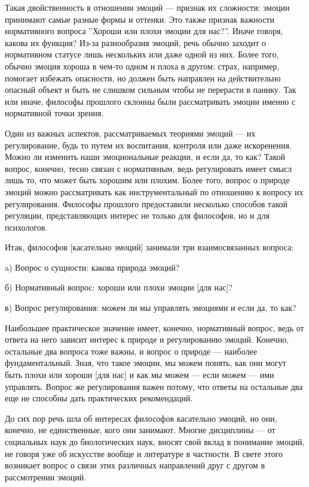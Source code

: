 \documentclass[11pt]{book}
\begin{document}
Такая двойственность в отношении эмоций --- признак их сложности: эмоции принимают самые разные формы и оттенки. Это также признак важности нормативного вопроса ''Хороши или плохи эмоции для нас?''. Иначе говоря, какова их функция? Из-за разнообразия эмоций, речь обычно заходит о нормативном статусе лишь нескольких или даже одной из них. Более того, обычно эмоция хороша в чем-то одном и плоха в другом: страх, например, помогает избежать опасности, но должен быть направлен на действительно опасный объект и быть не слишком сильным чтобы не перерасти в панику. Так или иначе, философы прошлого склонны были рассматривать эмоции именно с нормативной точки зрения.

Один из важных аспектов, рассматриваемых теориями эмоций --- их регулирование, будь то путем их воспитания, контроля или даже искоренения. Можно ли изменить наши эмоциональные реакции, и если да, то как? Такой вопрос, конечно, тесно связан с нормативным, ведь регулировать имеет смысл лишь то, что может быть хорошим или плохим. Более того, вопрос о природе эмоций можно рассматривать как инструментальный по отношению к вопросу их регулирования. Философы прошлого предоставили несколько способов такой регуляции, представляющих интерес не только для философов, но и для психологов.

Итак, философов [касательно эмоций] занимали три взаимосвязанных вопроса:

\smallskip

a) Вопрос о сущности: какова природа эмоций?

б) Нормативный вопрос: хороши или плохи эмоции [для нас]?

в) Вопрос регулирования: можем ли мы управлять эмоциями и если да, то как?

\smallskip

Наибольшее практическое значение имеет, конечно, нормативный вопрос, ведь от ответа на него зависит интерес к природе и регулированию эмоций. Конечно, остальные два вопроса тоже важны, и вопрос о природе --- наиболее фундаментальный. Зная, что такое эмоции, мы можем понять, как они могут быть плохи или хороши [для нас] и как мы можем --- если можем --- ими управлять. Вопрос же регулирования важен потому, что ответы на остальные два еще не способны дать практических рекомендаций.

До сих пор речь шла об интересах философов касательно эмоций, но они, конечно, не единственные, кого они занимают. Многие дисциплины --- от социальных наук до биологических наук, вносят свой вклад в понимание эмоций, не говоря уже об искусстве вообще и литературе в частности. В свете этого возникает вопрос о связи этих различных направлений друг с другом в рассмотрении эмоций.
\end{document}

